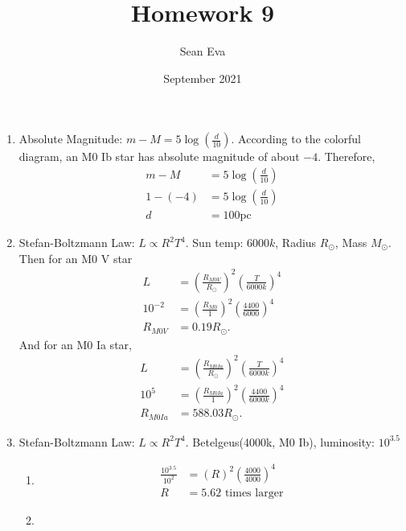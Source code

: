\documentclass{article}
\title{Homework 9}
\author{Sean Eva}
\date{September 2021}
\begin{document}
\maketitle

\begin{enumerate}
    \item 
    
    Absolute Magnitude: $m-M = 5\log(\frac{d}{10})$. According to the colorful diagram, an M0 Ib star has absolute magnitude of about $-4$. Therefore,
    \begin{align*}
        m-M &= 5\log(\frac{d}{10})\\
        1-(-4) &= 5\log(\frac{d}{10})\\
        d &= 100\text{pc}
    \end{align*}
    
    \item
    
    Stefan-Boltzmann Law: $L\propto R^2T^4$. Sun temp: $6000k$, Radius $R_\odot$, Mass $M_\odot$. Then for an M0 V star
    \begin{align*}
        L &= (\frac{R_{M0V}}{R_\odot})^2(\frac{T}{6000k})^4\\
        10^{-2} &= (\frac{R_{M0}}{1})^2(\frac{4400}{6000})^4\\
        R_{M0V} &= 0.19 R_\odot.
    \end{align*} And for an M0 Ia star,
    \begin{align*}
        L &= (\frac{R_{M0Ia}}{R_\odot})^2(\frac{T}{6000k})^4\\
        10^5 &= (\frac{R_{M0Ia}}{1})^2(\frac{4400}{6000k})^4\\
        R_{M0Ia} &= 588.03 R_\odot.
    \end{align*}
    
    \item
    
    Stefan-Boltzmann Law: $L\propto R^2T^4$. Betelgeus(4000k, M0 Ib), luminosity: $10^{3.5}$
    \begin{enumerate}
        \item 
        
        \begin{align*}
            \frac{10^{3.5}}{10^2} &= (R)^2(\frac{4000}{4000})^4\\
            R &= 5.62 \text{ times larger}
        \end{align*}
        
        \item
        

\end{enumerate}
\end{enumerate}
\end{document}
